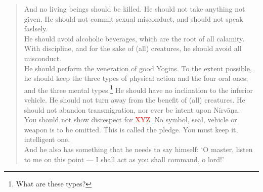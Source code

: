 \documentclass[11pt]{book}
\newcommand{\red}[1]{\textcolor{red}{#1}}
\begin{document}
\begin{verse}
And no living beings should be killed. He should not take anything not given. He should not commit sexual misconduct, and should not speak faslsely.\\
He should avoid alcoholic beverages, which are the root of all calamity. With discipline, and for the sake of (all) creatures, he should avoid all misconduct.\\
He should perform the veneration of good Yogins. To the extent possible, he should keep the three types of physical action and the four oral ones; and the three mental types.\footnote{What are these types?
}
He should have no inclination to the inferior vehicle. He should not turn away from the benefit of (all) creatures. He should not abandon transmigration, nor ever be intent upon Nirvāṇa.\\
You should not show disrespect for \red{XYZ}. No symbol, seal, vehicle or weapon is to be omitted. This is called the pledge. You must keep it, intelligent one.\\
And he also has something that he needs to say himself: `O master, listen to me on this point — I shall act as you shall command, o lord!'
\end{verse}
\end{document}
